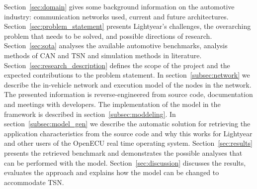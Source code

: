 Section~\ref{sec:domain} gives some background information on the automotive industry: communication networks used, current and future architectures. Section~\ref{sec:problem_statement} presents Lightyear's challenges, the overarching problem that needs to be solved, and possible directions of research. Section~\ref{sec:sota} analyses the available automotive benchmarks, analysis methods of CAN and TSN and simulation methods in literature. Section~\ref{sec:research_description} defines the scope of the project and the expected contributions to the problem statement. In section~\ref{subsec:network} we describe the in-vehicle network and execution model of the nodes in the network. The presented information is reverse-engineered from source code, documentation and meetings with developers. The implementation of the model in the \omnet framework is described in section~\ref{subsec:moddeling}. In section~\ref{subsec:model_gen} we describe the automatic solution for retrieving the application characteristics from the source code and why this works for Lightyear and other users of the OpenECU real time operating system. Section~\ref{sec:results} presents the retrieved benchmark and demonstrates the possible analyses that can be performed with the \omnet model. Section~\ref{sec:discussion} discusses the results, evaluates the approach and explains how the model can be changed to accommodate TSN.
